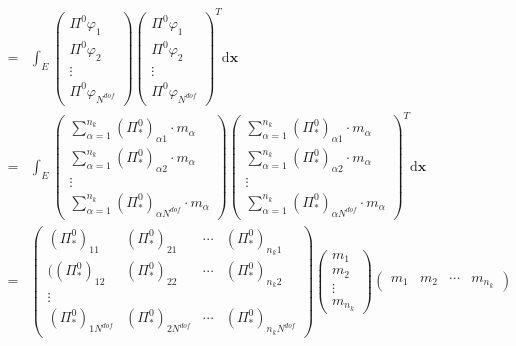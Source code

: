 \begin{equation*}
    \begin{aligned}
= & \int_E \begin{pmatrix} 
\Pi^0\varphi_1\\ 
\Pi^0\varphi_2 \\ 
\vdots\\
\Pi^0\varphi_{N^{dof}}
\end{pmatrix}\begin{pmatrix} 
\Pi^0\varphi_1\\ 
\Pi^0\varphi_2 \\ 
\vdots\\
\Pi^0\varphi_{N^{dof}}
\end{pmatrix}^T\mathrm d \mathbf x\\
= & \int_E \begin{pmatrix} 
\sum_{\alpha = 1}^{n_k}(\Pi_{*}^{0})_{\alpha 1}\cdot m_{\alpha}\\ 
\sum_{\alpha = 1}^{n_k}(\Pi_{*}^{0})_{\alpha 2}\cdot m_{\alpha} \\ 
\vdots\\
\sum_{\alpha = 1}^{n_k}(\Pi_{*}^{0})_{\alpha N^{dof}}\cdot m_{\alpha}
\end{pmatrix}\begin{pmatrix} 
\sum_{\alpha = 1}^{n_k}(\Pi_{*}^{0})_{\alpha 1}\cdot m_{\alpha}\\ 
\sum_{\alpha = 1}^{n_k}(\Pi_{*}^{0})_{\alpha 2}\cdot m_{\alpha} \\ 
\vdots\\
\sum_{\alpha = 1}^{n_k}(\Pi_{*}^{0})_{\alpha N^{dof}}\cdot m_{\alpha}
\end{pmatrix}^T\mathrm d \mathbf x\\
= & \begin{pmatrix} 
(\Pi_{*}^{0})_{1 1} & (\Pi_{*}^{0})_{2 1} & \cdots  & (\Pi_{*}^{0})_{n_k 1} \\ 
((\Pi_{*}^{0})_{1 2} & (\Pi_{*}^{0})_{2 2} & \cdots  & (\Pi_{*}^{0})_{n_k 2} \\ 
\vdots\\
(\Pi_{*}^{0})_{1 N^{dof}} & (\Pi_{*}^{0})_{2 N^{dof}} & \cdots  & (\Pi_{*}^{0})_{n_k N^{dof}}
\end{pmatrix}\begin{pmatrix} 
 m_{1}\\ 
 m_{2} \\ 
\vdots\\
 m_{n_k}
\end{pmatrix}\begin{pmatrix} 
m_{1} & m_{2} & \cdots & m_{n_k}

\end{pmatrix}
\end{aligned}
\end{equation*}
